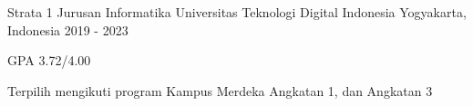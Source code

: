 

\begin{cventries}

  \cventry
    {Strata 1 Jurusan Informatika} %
    {Universitas Teknologi Digital Indonesia} %
    {Yogyakarta, Indonesia} %
    {2019 - 2023} %
    {
      \begin{cvitems} %
        \item {GPA 3.72/4.00}
        \item {Terpilih mengikuti program Kampus Merdeka
          Angkatan 1, dan Angkatan 3}
      \end{cvitems}
    }
\end{cventries}
